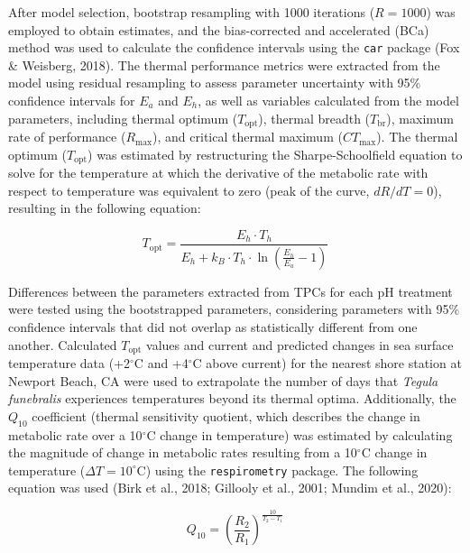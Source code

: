 \documentclass{CSUNthesis}
\begin{document}
After model selection, bootstrap resampling with 1000 iterations (\(R=1000\)) was employed to obtain estimates, and the bias-corrected and accelerated (BCa) method was used to calculate the confidence intervals using the \texttt{car} package (Fox \& Weisberg, 2018). The thermal performance metrics were extracted from the model using residual resampling to assess parameter uncertainty with 95\% confidence intervals for \(E_a\) and \(E_h\), as well as variables calculated from the model parameters, including thermal optimum (\(T_{\text{opt}}\)), thermal breadth (\(T_{\text{br}}\)), maximum rate of performance (\(R_{\text{max}}\)), and critical thermal maximum (\(CT_{\text{max}}\)). The thermal optimum (\(T_{\text{opt}}\)) was estimated by restructuring the Sharpe-Schoolfield equation to solve for the temperature at which the derivative of the metabolic rate with respect to temperature was equivalent to zero (peak of the curve, \(dR/dT = 0\)), resulting in the following equation:

\begin{equation}
T_{\text{opt}} = \frac{E_h \cdot T_h}{E_h + k_B \cdot T_h \cdot \ln\left( \frac{E_h}{E_a} - 1 \right)}
\label{eq:topt}
\end{equation}

Differences between the parameters extracted from TPCs for each pH treatment were tested using the bootstrapped parameters, considering parameters with 95\% confidence intervals that did not overlap as statistically different from one another. Calculated \(T_{\text{opt}}\) values and current and predicted changes in sea surface temperature data (+2\(^\circ\)C and +4\(^\circ\)C above current) for the nearest shore station at Newport Beach, CA were used to extrapolate the number of days that \textit{Tegula funebralis} experiences temperatures beyond its thermal optima. Additionally, the \(Q_{10}\) coefficient (thermal sensitivity quotient, which describes the change in metabolic rate over a 10\(^\circ\)C change in temperature) was estimated by calculating the magnitude of change in metabolic rates resulting from a 10\(^\circ\)C change in temperature (\(\Delta T = 10^\circ\)C) using the \texttt{respirometry} package. The following equation was used (Birk et al., 2018; Gillooly et al., 2001; Mundim et al., 2020):

\begin{equation}
Q_{10} = \left( \frac{R_2}{R_1} \right)^{\frac{10}{T_2 - T_1}}
\label{eq:q10}
\end{equation}
\end{document}
